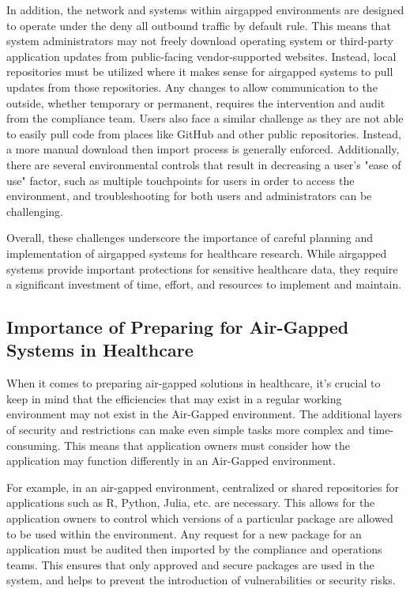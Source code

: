 \documentclass{amia}
\begin{document}
In addition, the network and systems within airgapped environments are designed to operate under the deny all outbound traffic by default rule. This means that system administrators may not freely download operating system or third-party application updates from public-facing vendor-supported websites. Instead, local repositories must be utilized where it makes sense for airgapped systems to pull updates from those repositories. Any changes to allow communication to the outside, whether temporary or permanent, requires the intervention and audit from the compliance team. Users also face a similar challenge as they are not able to easily pull code from places like GitHub and other public repositories. Instead, a more manual download then import process is generally enforced. Additionally, there are several environmental controls that result in decreasing a user's "ease of use" factor, such as multiple touchpoints for users in order to access the environment, and troubleshooting for both users and administrators can be challenging.

Overall, these challenges underscore the importance of careful planning and implementation of airgapped systems for healthcare research. While airgapped systems provide important protections for sensitive healthcare data, they require a significant investment of time, effort, and resources to implement and maintain.

\subsection*{Importance of Preparing for Air-Gapped Systems in Healthcare}

When it comes to preparing air-gapped solutions in healthcare, it's crucial to keep in mind that the efficiencies that may exist in a regular working environment may not exist in the Air-Gapped environment. The additional layers of security and restrictions can make even simple tasks more complex and time-consuming. This means that application owners must consider how the application may function differently in an Air-Gapped environment.

For example, in an air-gapped environment, centralized or shared repositories for applications such as R, Python, Julia, etc. are necessary. This allows for the application owners to control which versions of a particular package are allowed to be used within the environment. Any request for a new package for an application must be audited then imported by the compliance and operations teams. This ensures that only approved and secure packages are used in the system, and helps to prevent the introduction of vulnerabilities or security risks.
\end{document}
